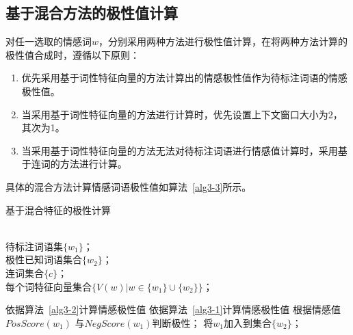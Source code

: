 \subsection{基于混合方法的极性值计算}
对任一选取的情感词$ w $，分别采用两种方法进行极性值计算，在将两种方法计算的极性值合成时，遵循以下原则：
\begin{enumerate}
\item 优先采用基于词性特征向量的方法计算出的情感极性值作为待标注词语的情感极性值。
\item 当采用基于词性特征向量的方法进行计算时，优先设置上下文窗口大小为2，其次为1。
\item 当采用基于词性特征向量的方法无法对待标注词语进行情感值计算时，采用基于连词的方法进行计算。
\end{enumerate}

具体的混合方法计算情感词语极性值如算法~\ref{alg3-3}所示。
\begin{algorithm}[htp]
\caption{基于混合特征的极性计算}
\label{alg3-3}
\begin{algorithmic}[1]
\REQUIRE ~~\\
待标注词语集$\{w_1\}$；\\
极性已知词语集合$\{w_2\}$；\\
连词集合$\{c\}$；\\
每个词特征向量集合$\{V(w)|w \in \{w_1\}\cup \{w_2\} \}$；

\STATE 依据算法~\ref{alg3-2}计算情感极性值
\STATE 依据算法~\ref{alg3-1}计算情感极性值
\ENDIF
\STATE 根据情感值 $PosScore(w_1)$ 与$ NegScore(w_1) $判断极性；
\STATE 将$ w_1 $加入到集合$ \{w_2\} $；
\ENDFOR
\end{algorithmic}
\end{algorithm}

